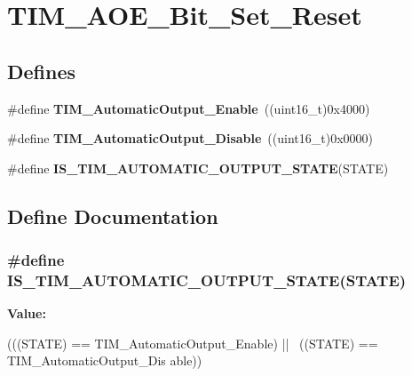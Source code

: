 \hypertarget{group__TIM__AOE__Bit__Set__Reset}{
\section{TIM\_\-AOE\_\-Bit\_\-Set\_\-Reset}
\label{group__TIM__AOE__Bit__Set__Reset}
}
\subsection*{Defines}
\begin{DoxyCompactItemize}
\item 
\hypertarget{group__TIM__AOE__Bit__Set__Reset_gaa416873d01fe62fe8d3f9c8bb7853fa1}{
\#define {\bfseries TIM\_\-AutomaticOutput\_\-Enable}~((uint16\_\-t)0x4000)}
\label{group__TIM__AOE__Bit__Set__Reset_gaa416873d01fe62fe8d3f9c8bb7853fa1}

\item 
\hypertarget{group__TIM__AOE__Bit__Set__Reset_ga0f80ba4fbadd434bc82ca63e904ace41}{
\#define {\bfseries TIM\_\-AutomaticOutput\_\-Disable}~((uint16\_\-t)0x0000)}
\label{group__TIM__AOE__Bit__Set__Reset_ga0f80ba4fbadd434bc82ca63e904ace41}

\item 
\#define {\bfseries IS\_\-TIM\_\-AUTOMATIC\_\-OUTPUT\_\-STATE}(STATE)
\end{DoxyCompactItemize}


\subsection{Define Documentation}
\hypertarget{group__TIM__AOE__Bit__Set__Reset_gaabce6b8865d80929bf69c6c3c7780846}{
\subsubsection[{IS\_\-TIM\_\-AUTOMATIC\_\-OUTPUT\_\-STATE}]{\setlength{\rightskip}{0pt plus 5cm}\#define IS\_\-TIM\_\-AUTOMATIC\_\-OUTPUT\_\-STATE(STATE)}}
\label{group__TIM__AOE__Bit__Set__Reset_gaabce6b8865d80929bf69c6c3c7780846}
{\bfseries Value:}
\begin{DoxyCode}
(((STATE) == TIM_AutomaticOutput_Enable) || \
                                              ((STATE) == TIM_AutomaticOutput_Dis
      able))
\end{DoxyCode}
